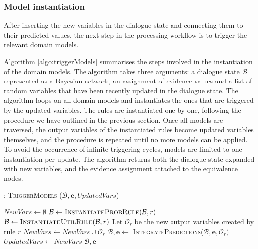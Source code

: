 \subsubsection*{Model instantiation}

After inserting the new variables in the dialogue state and connecting them to their predicted values, the next step in the processing workflow is to trigger the relevant domain models. 

Algorithm \ref{algo:triggerModels} summarises the steps involved in the instantiation of the domain models. The algorithm takes three arguments: a dialogue state $\mathcal{B}$ represented as a Bayesian network, an assignment of evidence values and a list of random variables that have been recently updated in the dialogue state. The algorithm loops on all domain models and instantiates the ones that are triggered by the updated variables. The rules are instantiated one by one, following the procedure we have outlined in the previous section. Once all models are traversed, the output variables of the instantiated rules become updated variables themselves, and the procedure is repeated until no more models can be applied.  To avoid the occurrence of infinite triggering cycles, models are limited to one instantiation per update. The algorithm returns both the dialogue state expanded with new variables, and the evidence assignment attached to the equivalence nodes. 


\begin{algorithm}[h]
\caption{: \textsc{TriggerModels} ($\mathcal{B}, \mathbf{e}, \mathit{UpdatedVars}$)}
\begin{algorithmic}[1] \vspace{1mm}
\STATE $\mathit{NewVars} \leftarrow \emptyset$
\STATE $\mathcal{B} \leftarrow \textsc{InstantiateProbRule}(\mathcal{B},r)$
\STATE $\mathcal{B} \leftarrow \textsc{InstantiateUtilRule}(\mathcal{B},r)$
\ENDIF
\STATE Let $\mathcal{O}_r$ be the new output variables created by rule $r$
\STATE $\mathit{NewVars} \leftarrow \mathit{NewVars} \cup \mathcal{O}_r$
\STATE $\mathcal{B}, \mathbf{e} \leftarrow $ \textsc{IntegratePredictions}($\mathcal{B}, \mathbf{e}, \mathcal{O}_r)$
\ENDFOR
\ENDIF
\ENDFOR 
\STATE $\mathit{UpdatedVars} \leftarrow \mathit{NewVars}$
\ENDWHILE 
\RETURN $\mathcal{B}, \mathbf{e}$
\end{algorithmic}
\label{algo:triggerModels}
\end{algorithm}


